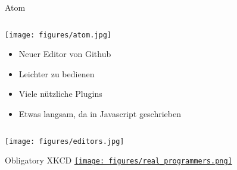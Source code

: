 \begin{frame}{Atom}
  \begin{columns}
    \begin{column}{0.47\textwidth}
      \centering
      \texttt{[image: figures/atom.jpg]}
      \begin{itemize}
        \item Neuer Editor von Github
        \item Leichter zu bedienen
        \item Viele nützliche Plugins
        \item Etwas langsam, da in Javascript geschrieben
      \end{itemize}
    \end{column}
  \end{columns}
\end{frame}

\begin{frame}
  \centering
  \texttt{[image: figures/editors.jpg]}
\end{frame}

\begin{frame}{Obligatory XKCD}
  \centering
  \href{http://xkcd.com/378/}{\texttt{[image: figures/real\_programmers.png]}}
\end{frame}
